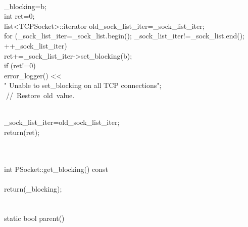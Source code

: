 \documentclass{article}
\begin{document}
 {
\\
     _blocking=b;
\\
         int ret=0;
\\
         list<TCPSocket>::iterator old_sock_list_iter=_sock_list_iter;
\\
     for (_sock_list_iter=_sock_list.begin(); _sock_list_iter!=_sock_list.end();
\\
          ++_sock_list_iter)
\\
         ret+=_sock_list_iter->set_blocking(b);
\\
     if (ret!=0)
\\
         error_logger() << 
\\
                                 "    Unable to set_blocking on all TCP connections\n";
\\
         
\hbox{// Restore old value.}\strut\\
         _sock_list_iter=old_sock_list_iter;
\\
     return(ret);
\\
 }
\\
 
\\
 int PSocket::get_blocking() const
\\
 {
\\
         return(_blocking);
\\
 }
\\
 
\\
 static bool parent()
\\
\end{document}
